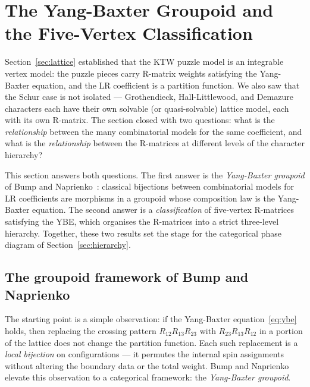 
\section{The Yang-Baxter Groupoid and the Five-Vertex Classification}
\label{sec:groupoid}

Section~\ref{sec:lattice} established that the KTW puzzle model is an
integrable vertex model: the puzzle pieces carry R-matrix weights
satisfying the Yang-Baxter equation, and the LR coefficient is a
partition function.  We also saw that the Schur case is not isolated
--- Grothendieck, Hall-Littlewood, and Demazure characters each have
their own solvable (or quasi-solvable) lattice model, each with its
own R-matrix.  The section closed with two questions: what is the
\emph{relationship} between the many combinatorial models for the same
coefficient, and what is the \emph{relationship} between the R-matrices
at different levels of the character hierarchy?

This section answers both questions.  The first answer is the
\emph{Yang-Baxter groupoid} of Bump and
Naprienko~\cite{bump-naprienko-2025}: classical bijections between
combinatorial models for LR coefficients are morphisms in a groupoid
whose composition law is the Yang-Baxter equation.  The second answer
is a \emph{classification} of five-vertex R-matrices satisfying the
YBE, which organises the R-matrices into a strict three-level
hierarchy.  Together, these two results set the stage for the
categorical phase diagram of Section~\ref{sec:hierarchy}.


\subsection{The groupoid framework of Bump and Naprienko}
\label{sec:groupoid-bn}

The starting point is a simple observation: if the Yang-Baxter
equation~\eqref{eq:ybe} holds, then replacing the crossing pattern
$R_{12}R_{13}R_{23}$ with $R_{23}R_{13}R_{12}$ in a portion of the
lattice does not change the partition function.  Each such replacement
is a \emph{local bijection} on configurations --- it permutes the
internal spin assignments without altering the boundary data or the
total weight.  Bump and Naprienko~\cite{bump-naprienko-2025} elevate
this observation to a categorical framework: the \emph{Yang-Baxter
groupoid}.

